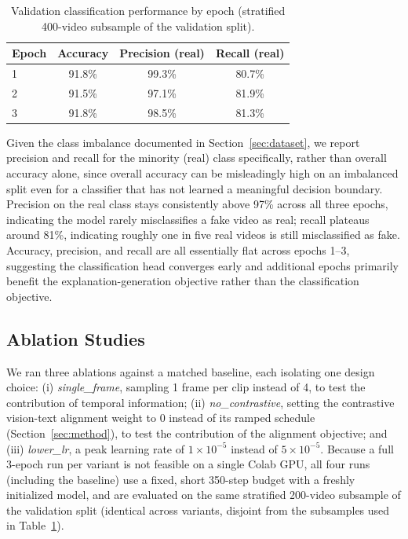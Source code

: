 \documentclass[acmsmall,review=false]{acmart}
\begin{document}
\begin{table}[h]
\centering
\caption{Validation classification performance by epoch (stratified 400-video subsample of the validation split).}
\label{tab:results}
\begin{tabular}{lccc}
\toprule
\textbf{Epoch} & \textbf{Accuracy} & \textbf{Precision (real)} & \textbf{Recall (real)} \\
\midrule
1 & 91.8\% & 99.3\% & 80.7\% \\
2 & 91.5\% & 97.1\% & 81.9\% \\
3 & 91.8\% & 98.5\% & 81.3\% \\
\bottomrule
\end{tabular}
\end{table}

Given the class imbalance documented in Section~\ref{sec:dataset}, we report
precision and recall for the minority (real) class specifically, rather than
overall accuracy alone, since overall accuracy can be misleadingly high on an
imbalanced split even for a classifier that has not learned a meaningful
decision boundary. Precision on the real class stays consistently above 97\%
across all three epochs, indicating the model rarely misclassifies a fake
video as real; recall plateaus around 81\%, indicating roughly one in five
real videos is still misclassified as fake. Accuracy, precision, and recall
are all essentially flat across epochs 1--3, suggesting the classification
head converges early and additional epochs primarily benefit the
explanation-generation objective rather than the classification objective.

\subsection{Ablation Studies}
\label{sec:ablations}

We ran three ablations against a matched baseline, each isolating one design
choice: (i) \emph{single\_frame}, sampling 1 frame per clip instead of 4, to
test the contribution of temporal information; (ii) \emph{no\_contrastive},
setting the contrastive vision-text alignment weight to 0 instead of its
ramped schedule (Section~\ref{sec:method}), to test the contribution of the
alignment objective; and (iii) \emph{lower\_lr}, a peak learning rate of
$1\times10^{-5}$ instead of $5\times10^{-5}$. Because a full 3-epoch run per
variant is not feasible on a single Colab GPU, all four runs (including the
baseline) use a fixed, short 350-step budget with a freshly initialized model,
and are evaluated on the same stratified 200-video subsample of the validation
split (identical across variants, disjoint from the subsamples used in
Table~\ref{tab:results}).
\end{document}

